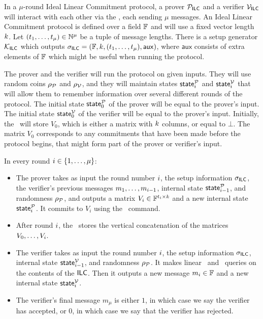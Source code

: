 \begin{definition}

In a $\mu$-round Ideal Linear Commitment protocol, a prover $\mathcal{P}_{\mathsf{ILC}}$ and a verifier $\mathcal{V}_{\mathsf{ILC}}$ will interact with each other via the \ILC, each sending $\mu$ messages. An Ideal Linear Commitment protocol is defined over a field $\mathbb{F}$ and will use a fixed vector length $k$. Let $(t_1,\ldots,t_\mu) \in \mathbb{N}^\mu$ be a tuple of message lengths. There is a setup generator $\mathcal{K}_{\mathsf{ILC}}$ which outputs $\mathsf{\sigma}_{\mathsf{ILC}} = (\mathbb{F},k,(t_1,\ldots,t_\mu),\mathsf{aux})$, where $\mathsf{aux}$ consists of extra elements of $\mathbb{F}$ which might be useful when running the protocol.

The prover and the verifier will run the protocol on given inputs. They will use random coins $\rho_{\mathcal{P}}$ and $\rho_{\mathcal{V}}$, and they will maintain states $\mathsf{state}^{\mathcal{P}}_i$ and $\mathsf{state}^{\mathcal{V}}_i$ that will allow them to remember information over several different rounds of the protocol. The initial state $\mathsf{state}^{\mathcal{P}}_0$ of the prover will be equal to the prover's input. The initial state $\mathsf{state}^{\mathcal{V}}_0$ of the verifier will be equal to the prover's input. Initially, the \ILC\ will store $V_0$, which is either a matrix with $k$ columns, or equal to $\bot$. The matrix $V_0$ corresponds to any commitments that have been made before the protocol begins, that might form part of the prover or verifier's input.

In every round $i \in \{ 1,\ldots,\mu \}$:
\begin{itemize}
\item The prover takes as input the round number $i$, the setup information $\mathsf{\sigma}_{\mathsf{ILC}}$, the verifier's previous messages $m_1,\ldots,m_{i-1}$, internal state $\mathsf{state}^{\mathcal{P}}_{i-1}$, and randomness $\rho_{\mathcal{P}}$, and outputs a matrix $V_i \in \mathbb{F}^{t_i \times k}$ and a new internal state $\mathsf{state}^{\mathcal{P}}_{i}$. It commits to $V_i$ using the \ILCcommit\ command.
\item After round $i$, the \ILC \ stores the vertical concatenation of the matrices $V_0,\ldots,V_i$.
\item The verifier takes as input the round number $i$, the setup information $\mathsf{\sigma}_{\mathsf{ILC}}$, internal state $\mathsf{state}^{\mathcal{V}}_{i-1}$, and randomness $\rho_{\mathcal{P}}$. It makes linear \ILCopen\ and \ILCcheck\ queries on the contents of the $\mathsf{ILC}$. Then it outputs a new message $m_i \in \mathbb{F}$ and a new internal state $\mathsf{state}_i^{\mathcal{V}}$.
\item The verifier's final message $m_\mu$ is either $1$, in which case we say the verifier has accepted, or $0$, in which case we say that the verifier has rejected.
\end{itemize}
\end{definition}

